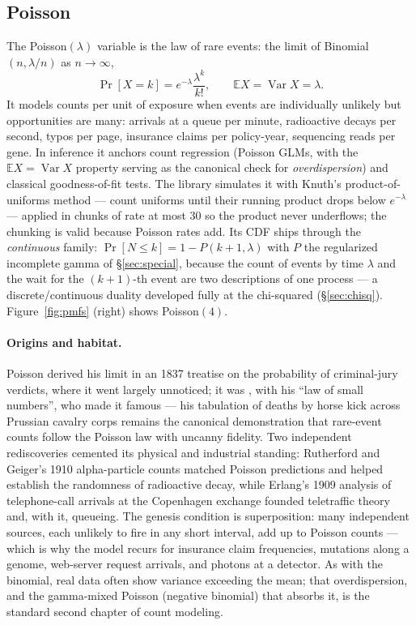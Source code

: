 \documentclass[11pt]{article}
\numberwithin{equation}{section}
\newcommand{\E}{\mathbb{E}}
\newcommand{\Var}{\operatorname{Var}}
\begin{document}
\subsection{Poisson}\label{sec:poisson}

The Poisson$(\lambda)$ variable is the law of rare events: the limit of
Binomial$(n, \lambda/n)$ as $n\to\infty$,
\[
\Pr[X=k]=e^{-\lambda}\frac{\lambda^k}{k!},\qquad
\E X=\Var X=\lambda .
\]
It models counts per unit of exposure when events are individually
unlikely but opportunities are many: arrivals at a queue per minute,
radioactive decays per second, typos per page, insurance claims per
policy-year, sequencing reads per gene.  In inference it anchors count
regression (Poisson GLMs, with the $\E X=\Var X$ property serving as the
canonical check for \emph{overdispersion}) and classical goodness-of-fit
tests.  The library simulates it with Knuth's product-of-uniforms method
\citep[\S3.4.1]{knuth1997} --- count uniforms until their running product
drops below $e^{-\lambda}$ --- applied in chunks of rate at most 30 so the
product never underflows; the chunking is valid because Poisson rates add.
Its CDF ships through the \emph{continuous} family:
$\Pr[N\le k]=1-P(k{+}1,\lambda)$ with $P$ the regularized incomplete
gamma of \S\ref{sec:special}, because the count of events by time
$\lambda$ and the wait for the $(k{+}1)$-th event are two descriptions
of one process --- a discrete/continuous duality developed fully at the
chi-squared (\S\ref{sec:chisq}).
Figure~\ref{fig:pmfs} (right) shows Poisson$(4)$.

\paragraph{Origins and habitat.}
Poisson derived his limit in an 1837 treatise on the probability of
criminal-jury verdicts, where it went largely unnoticed; it was
\citet{bortkiewicz1898}, with his ``law of small numbers'', who made it
famous --- his tabulation of deaths by horse kick across Prussian cavalry
corps remains the canonical demonstration that rare-event counts follow
the Poisson law with uncanny fidelity.  Two independent rediscoveries
cemented its physical and industrial standing: Rutherford and Geiger's
1910 alpha-particle counts matched Poisson predictions and helped
establish the randomness of radioactive decay, while Erlang's 1909
analysis of telephone-call arrivals at the Copenhagen exchange founded
teletraffic theory and, with it, queueing.  The genesis condition is
superposition: many independent sources, each unlikely to fire in any
short interval, add up to Poisson counts --- which is why the model
recurs for insurance claim frequencies, mutations along a genome,
web-server request arrivals, and photons at a detector.  As with the
binomial, real data often show variance exceeding the mean; that
overdispersion, and the gamma-mixed Poisson (negative binomial) that
absorbs it, is the standard second chapter of count modeling.
\end{document}
